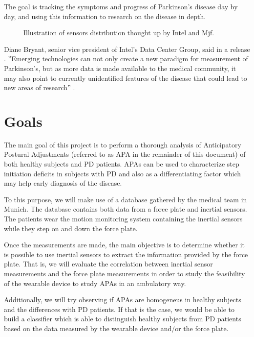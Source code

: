 The goal is tracking the  symptoms and progress of Parkinson’s disease day by day, and using this information to research on the disease in depth.

\begin{figure}[H]
	\centering
	\caption{Illustration of sensors distribution thought up by Intel and Mjf.\cite{IntelAndMjf}}
	\label{fig:IntelAndMjf}
\end{figure}

Diane Bryant, senior vice president of Intel's Data Center Group, said in a release \cite{IntelAndMjf}.
''Emerging technologies can not only create a new paradigm for measurement of Parkinson's, but as more data is made available to the medical community, it may also point to currently unidentified features of the disease that could lead to new areas of research'' .

\section{Goals}

The main goal of this project is to perform a thorough analysis of Anticipatory Postural Adjustments (referred to as APA in the remainder of this document) of both healthy subjects and PD patients. APAs can be used to characterize step initiation deficits in subjects with PD and also as a differentiating factor which may help early diagnosis of the disease.

To this purpose, we will make use of a database gathered by the medical team in Munich. The database contains both data from a force plate and inertial sensors. The patients wear the motion monitoring system containing the inertial sensors while they step on and down the force plate.

Once the measurements are made, the main objective is to determine whether it is possible to use inertial sensors to extract the information provided by the force plate. That is, we will evaluate the correlation between inertial sensor measurements and the force plate measurements in order to study the feasibility of the wearable device to study APAs in an ambulatory way. 

Additionally, we will try observing if APAs are homogeneus in healthy subjects and the differences with  PD patients. If that is the case, we would be able to build a classifier which is able to distinguish healthy subjects from PD patients based on the data measured by the wearable device and/or the force plate.

